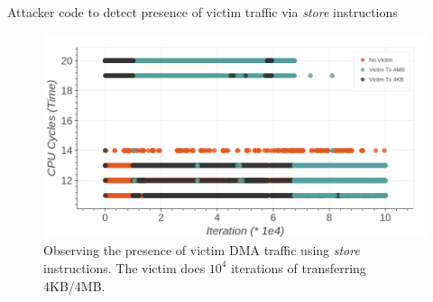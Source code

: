 \begin{minipage}{\textwidth}
    
    \captionsetup{type=lstlisting}
    \caption{Attacker code to detect presence of victim traffic via \textit{store} instructions}
    \label{lst:timing-victim-with-stores}
\end{minipage}

\begin{figure}[!htb]
    \centering
    \includegraphics[width=\columnwidth]{figures/interconnect-sc/store-ops/cpu_store_victim_observation.png}
    \caption{Observing the presence of victim DMA traffic using \textit{store} instructions. The victim does $10^4$ iterations of transferring 4KB/4MB.}
    \label{fig:cpu-store-victim-observation}
\end{figure}
